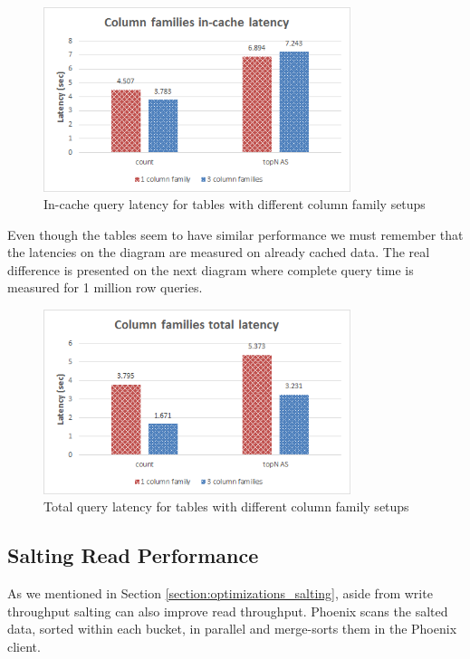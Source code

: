 \begin{figure}[H]
\centering
\includegraphics[width=0.8\textwidth]{figures/benchmarks_hbase_cf_in-cache_latency}
\caption{In-cache query latency for tables with different column family setups}
\label{figure:benchmarks_hbase_cf_in-cache_latency}
\end{figure}

Even though the tables seem to have similar performance we must remember that the latencies on the diagram are measured on already cached data. The real difference is presented on the next diagram where complete query time is measured for 1 million row queries.

\begin{figure}[H]
\centering
\includegraphics[width=0.8\textwidth]{figures/benchmarks_hbase_cf_total_latency}
\caption{Total query latency for tables with different column family setups}
\label{figure:benchmarks_hbase_cf_total_latency}
\end{figure}

\subsection{Salting Read Performance}\label{subsection:benchmarks_hbase_salting}

As we mentioned in Section \ref{section:optimizations_salting}, aside from write throughput salting can also improve read throughput. Phoenix scans the  salted data, sorted within each bucket, in parallel and merge-sorts them in the Phoenix client.

